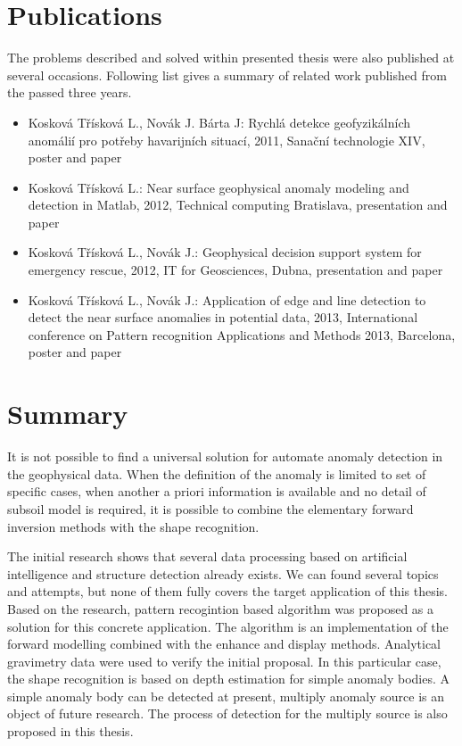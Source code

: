\documentclass[FM]{tulthesis}
\begin{document}
\chapter{Publications} \label{chap:publications}

The problems described and solved within presented thesis were also published at several occasions. Following list gives a summary of related work published from the passed three years.

\begin{itemize}
\item Kosková Třísková L., Novák J. Bárta J: Rychlá detekce geofyzikálních anomálií pro potřeby havarijních situací, 2011, Sanační technologie XIV, poster and paper
\item Kosková Třísková L.: Near surface geophysical anomaly modeling and detection in Matlab, 2012, Technical computing Bratislava, presentation and paper
\item Kosková Třísková L., Novák J.: Geophysical decision support system for emergency rescue, 2012, IT for Geosciences, Dubna, presentation and paper
\item Kosková Třísková L., Novák J.: Application of edge and line detection to detect the near surface anomalies in potential data, 2013, International conference on Pattern recognition Applications and Methods 2013, Barcelona, poster and paper
\end{itemize}

\chapter{Summary} \label{chap:summary}

It is not possible to find a universal solution for automate anomaly detection in the geophysical data. When the definition of the anomaly is limited to set of specific cases, when another a priori information is available and no detail of subsoil model is required, it is possible to combine the elementary forward inversion methods with the shape recognition. 

The initial research shows that several data processing based on artificial intelligence and structure detection already exists. We can found several topics and attempts, but none of them fully covers the target application of this thesis. Based on the research, pattern recogintion based algorithm was proposed as a solution for this concrete application. The algorithm is an implementation of the forward modelling combined with the enhance and display methods. Analytical gravimetry data were used to verify the initial proposal. In this particular case, the shape recognition is based on depth estimation for simple anomaly bodies. A simple anomaly body can be detected at present, multiply anomaly source is an object of future research. The process of detection for the multiply source is also proposed in this thesis.
\end{document}

